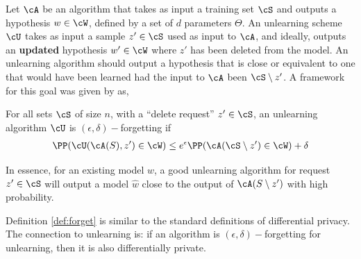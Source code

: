 Let $\cA$ be an algorithm that takes as input a training set $\cS$ and outputs a hypothesis $w \in \cW$, defined by a set of $d$ parameters $\Theta$. 
An unlearning scheme $\cU$ takes as input a sample $z' \in \cS$ used as input to $\cA$, and ideally, outputs an {\bf updated} hypothesis $w' \in \cW$ where $z'$ has been deleted from the model.
%
%
An unlearning algorithm should output a hypothesis that is close or equivalent to one that would have been learned had the input to $\cA$ been $\cS \setminus z^\prime$. A framework for this goal was given by \cite{ginart2019making} as,
\begin{definition}\label{def:forget}
	For all sets $\cS$ of size $n$, with a ``delete request'' $z' \in \cS$, an unlearning algorithm $\cU$ is $(\epsilon, \delta)-$forgetting if
	\begin{align}
	\PP(\cU(\cA(S), z') \in \cW) \leq e^\epsilon\PP(\cA(\cS\setminus z') \in \cW) + \delta
	\end{align}
\end{definition}
In essence, for an existing model $w$, a good unlearning algorithm for request $z' \in \cS$ will output a model $\hat{w}$ close to the output of $\cA(S \setminus z')$ with high probability.

\begin{remark}
	Definition \ref{def:forget} is similar to the standard definitions of differential privacy. The connection to unlearning is: if an algorithm is $(\epsilon, \delta)-$forgetting for unlearning, then it is also differentially private. 
\end{remark}

